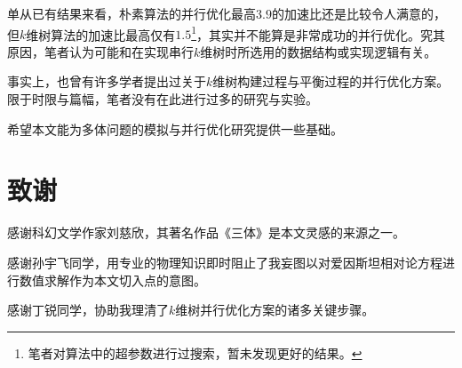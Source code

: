 \documentclass[lang=cn,11pt,a4paper,cite=authoryear]{elegantpaper}
\begin{document}
单从已有结果来看，朴素算法的并行优化最高$3.9$的加速比还是比较令人满意的，但$k$维树算法的加速比最高仅有$1.5$\footnote{笔者对算法中的超参数进行过搜索，暂未发现更好的结果。}，其实并不能算是非常成功的并行优化。究其原因，笔者认为可能和在实现串行$k$维树时所选用的数据结构或实现逻辑有关。

事实上，也曾有许多学者提出过关于$k$维树构建过程与平衡过程的并行优化方案。限于时限与篇幅，笔者没有在此进行过多的研究与实验。 

希望本文能为多体问题的模拟与并行优化研究提供一些基础。

\section{致谢}

感谢科幻文学作家刘慈欣，其著名作品《三体》是本文灵感的来源之一。

感谢孙宇飞同学，用专业的物理知识即时阻止了我妄图以对爱因斯坦相对论方程进行数值求解作为本文切入点的意图。

感谢丁锐同学，协助我理清了$k$维树并行优化方案的诸多关键步骤。

\nocite{*}

\end{document}
